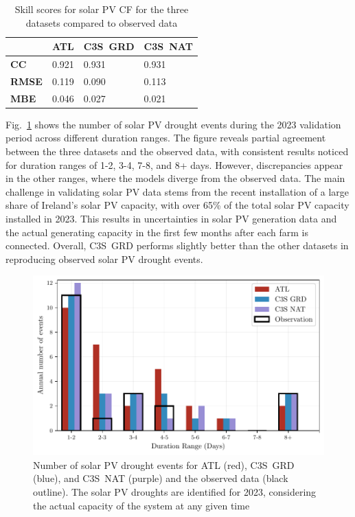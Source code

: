\documentclass[preprint, 12pt]{elsarticle}
\begin{document}
\begin{table}[!ht]
	\centering
	\begin{tabular}{l|lll|}
		\cline{2-4}
		& \textbf{ATL} & \textbf{C3S~GRD} & \textbf{C3S~NAT} \\ \hline
		\multicolumn{1}{|l|}{\textbf{CC}}   & 0.921           & 0.931            & 0.931            \\ \hline
		\multicolumn{1}{|l|}{\textbf{RMSE}} & 0.119           & 0.090            & 0.113            \\ \hline
		\multicolumn{1}{|l|}{\textbf{MBE}}   & 0.046           & 0.027           & 0.021           \\ \hline
	\end{tabular}
	\caption{Skill scores for solar PV CF for the three datasets compared to observed data}
	\label{tab:pv_skill_scores}
\end{table}

Fig.~\ref{fig:bar_number_events_verification_pv} shows the number of solar PV drought events during the 2023 validation period across different duration ranges. The figure reveals partial agreement between the three datasets and the observed data, with consistent results noticed for duration ranges of 1-2, 3-4, 7-8, and 8+ days. However, discrepancies appear in the other ranges, where the models diverge from the observed data. The main challenge in validating solar PV data stems from the recent installation of a large share of Ireland’s solar PV capacity, with over 65\% of the total solar PV capacity installed in 2023. This results in uncertainties in solar PV generation data and the actual generating capacity in the first few months after each farm is connected. Overall, C3S~GRD performs slightly better than the other datasets in reproducing observed solar PV drought events.

\begin{figure}[!ht]
	\centering
	\includegraphics[width=\textwidth]{verification_pv_number_events.pdf}
	\caption{Number of solar PV drought events for ATL (red), C3S~GRD (blue), and C3S~NAT (purple) and the observed data (black outline). The solar PV droughts are identified for 2023, considering the actual capacity of the system at any given time}
	\label{fig:bar_number_events_verification_pv}
\end{figure}
\end{document}
